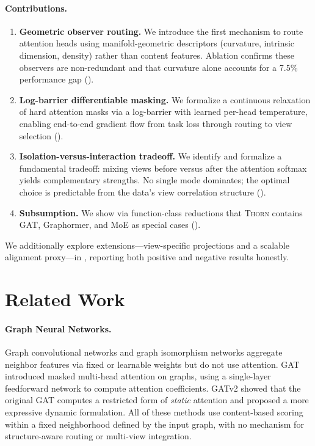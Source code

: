 \documentclass[11pt,a4paper]{article}
\newcommand{\thorn}{\textsc{Thorn}}
\begin{document}
\paragraph{Contributions.}
\begin{enumerate}[label=(\arabic*),nosep]
  \item \textbf{Geometric observer routing.}
    We introduce the first mechanism to route attention heads using
    manifold-geometric descriptors (curvature, intrinsic dimension,
    density) rather than content features.
    Ablation confirms these observers are non-redundant and that
    curvature alone accounts for a 7.5\% performance gap
    ().
  \item \textbf{Log-barrier differentiable masking.}
    We formalize a continuous relaxation of hard attention masks via a
    log-barrier with learned per-head temperature, enabling end-to-end
    gradient flow from task loss through routing to view selection
    ().
  \item \textbf{Isolation-versus-interaction tradeoff.}
    We identify and formalize a fundamental tradeoff: mixing views
    before versus after the attention softmax yields complementary
    strengths.
    No single mode dominates; the optimal choice is predictable from
    the data's view correlation structure
    ().
  \item \textbf{Subsumption.}
    We show via function-class reductions that \thorn{} contains GAT,
    Graphormer, and MoE as special cases ().
\end{enumerate}
We additionally explore extensions---view-specific projections and a
scalable alignment proxy---in ,
reporting both positive and negative results honestly.

\section{Related Work}
\label{sec:related}

\paragraph{Graph Neural Networks.}
Graph convolutional networks \citep{kipf2017semi} and graph isomorphism
networks \citep{xu2019powerful} aggregate neighbor features via fixed
or learnable weights but do not use attention.
GAT \citep{velickovic2018graph} introduced masked multi-head attention on
graphs, using a single-layer feedforward network to compute attention
coefficients.
GATv2 \citep{brody2022how} showed that the original GAT computes a
restricted form of \emph{static} attention and proposed a more expressive
dynamic formulation.
All of these methods use content-based scoring within a fixed neighborhood
defined by the input graph, with no mechanism for structure-aware
routing or multi-view integration.
\end{document}
